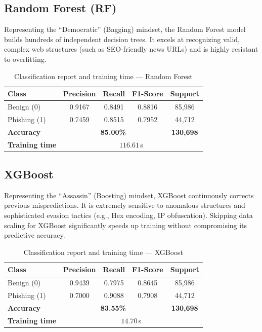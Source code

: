 \documentclass[12pt,a4paper]{article}
\begin{document}
\subsection{Random Forest (RF)}
Representing the ``Democratic'' (Bagging) mindset, the Random Forest model builds hundreds of independent decision trees. It excels at recognizing valid, complex web structures (such as SEO-friendly news URLs) and is highly resistant to overfitting.

\begin{table}[H]
    \centering
    \begin{tabular}{lcccc}
        \toprule
        \textbf{Class} & \textbf{Precision} & \textbf{Recall} & \textbf{F1-Score} & \textbf{Support} \\
        \midrule
        Benign (0)     & 0.9167 & 0.8491 & 0.8816 & 85{,}986 \\[2pt]
        Phishing (1)   & 0.7459 & 0.8515 & 0.7952 & 44{,}712 \\
        \midrule
        \textbf{Accuracy} & \multicolumn{3}{c}{\textbf{85.00\%}} & \textbf{130{,}698} \\
        \midrule
        \textbf{Training time} & \multicolumn{4}{c}{$116.61$\,s} \\
        \bottomrule
    \end{tabular}
    \caption{Classification report and training time --- Random Forest}
    \label{tab:rf_metrics}
\end{table}

\subsection{XGBoost}
Representing the ``Assassin'' (Boosting) mindset, XGBoost continuously corrects previous mispredictions. It is extremely sensitive to anomalous structures and sophisticated evasion tactics (e.g., Hex encoding, IP obfuscation). Skipping data scaling for XGBoost significantly speeds up training without compromising its predictive accuracy.

\begin{table}[H]
    \centering
    \begin{tabular}{lcccc}
        \toprule
        \textbf{Class} & \textbf{Precision} & \textbf{Recall} & \textbf{F1-Score} & \textbf{Support} \\
        \midrule
        Benign (0)     & 0.9439 & 0.7975 & 0.8645 & 85{,}986 \\[2pt]
        Phishing (1)   & 0.7000 & 0.9088 & 0.7908 & 44{,}712 \\
        \midrule
        \textbf{Accuracy} & \multicolumn{3}{c}{\textbf{83.55\%}} & \textbf{130{,}698} \\
        \midrule
        \textbf{Training time} & \multicolumn{4}{c}{$14.70$\,s} \\
        \bottomrule
    \end{tabular}
    \caption{Classification report and training time --- XGBoost}
    \label{tab:xgb_metrics}
\end{table}
\end{document}
